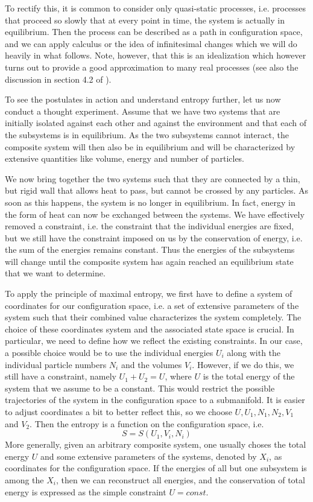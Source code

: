 \documentclass[a4paper, draft]{article}
\theoremstyle{own}
\theoremstyle{remark}
\begin{document}
To rectify this, it is common to consider only quasi-static processes, i.e. processes that proceed so slowly that at every point in time, the system is actually in equilibrium. Then the process can be described as a path in configuration space, and we can apply calculus or the idea of infinitesimal changes which we will do heavily in what follows. Note, however, that this is an idealization which however turns out to provide a good approximation to many real processes (see also the discussion in section 4.2 of \cite{Callen}).

To see the postulates in action and understand entropy further, let us now conduct a thought experiment. Assume that we have two systems that are initially isolated against each other and against the environment and that each of the subsystems is in equilibrium. As the two subsystems cannot interact, the composite system will then also be in equilibrium and will be characterized by extensive quantities like volume, energy and number of particles.

We now bring together the two systems such that they are connected by a thin, but rigid wall that allows heat to pass, but cannot be crossed by any particles. As soon as this happens, the system is no longer in equilibrium. In fact, energy in the form of heat can now be exchanged between the systems. We have effectively removed a constraint, i.e. the constraint that the individual energies are fixed, but we still have the constraint imposed on us by the conservation of energy, i.e. the sum of the energies remains constant. Thus the energies of the subsystems will change until the composite system has again reached an equilibrium state that we want to determine.

To apply the principle of maximal entropy, we first have to define a system of coordinates for our configuration space, i.e. a set of extensive parameters of the system such that their combined value characterizes the system completely. The choice of these coordinates system and the associated state space is crucial. In particular, we need to define how we reflect the existing constraints. In our case, a possible choice would be to use the individual energies $U_i$ along with the individual particle numbers $N_i$ and the volumes $V_i$. However, if we do this, we still have a constraint, namely $U_1 + U_2 = U$, where $U$ is the total energy of the system that we assume to be a constant. This would restrict the possible trajectories of the system in the configuration space to a submanifold. It is easier to adjust coordinates a bit to better reflect this, so we choose $U, U_1, N_1, N_2, V_1$ and $V_2$. Then the entropy is a function on the configuration space, i.e.
$$
S = S(U_1, V_i, N_i)
$$
More generally, given an arbitrary composite system, one usually choses the total energy $U$ and some extensive parameters of the systems, denoted by $X_i$, as coordinates for the configuration space. If the energies of all but one subsystem is among the $X_i$, then we can reconstruct all energies, and the conservation of total energy is expressed as the simple constraint $U = const$.
\end{document}
